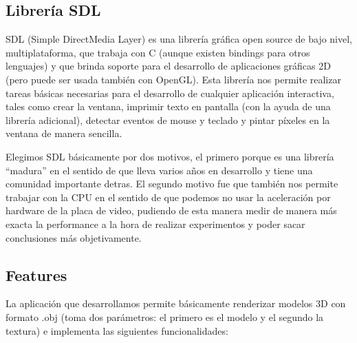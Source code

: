 \documentclass[a4paper]{article}
\begin{document}
\subsection{Librería SDL}
SDL (Simple DirectMedia Layer) es una librería gráfica open source de bajo nivel, multiplataforma, que trabaja con C (aunque existen bindings para otros lenguajes) y que brinda soporte para el desarrollo de aplicaciones gráficas 2D (pero puede ser usada también con OpenGL). Esta librería nos permite realizar tareas básicas necesarias para el desarrollo de cualquier aplicación interactiva, tales como crear la ventana, imprimir texto en pantalla (con la ayuda de una librería adicional), detectar eventos de mouse y teclado y pintar píxeles en la ventana de manera sencilla.
\par Elegimos SDL básicamente por dos motivos, el primero porque es una librería ``madura'' en el sentido de que lleva varios años en desarrollo y tiene una comunidad importante detras. El segundo motivo fue que también nos permite trabajar con la CPU en el sentido de que podemos no usar la aceleración por hardware de la placa de video, pudiendo de esta manera medir de manera más exacta la performance a la hora de realizar experimentos y poder sacar conclusiones más objetivamente. 

\subsection{Features}
La aplicación que desarrollamos permite básicamente renderizar modelos 3D con formato .obj  (toma dos parámetros: el primero es el modelo y el segundo la textura) e implementa las siguientes funcionalidades: 
\end{document}
